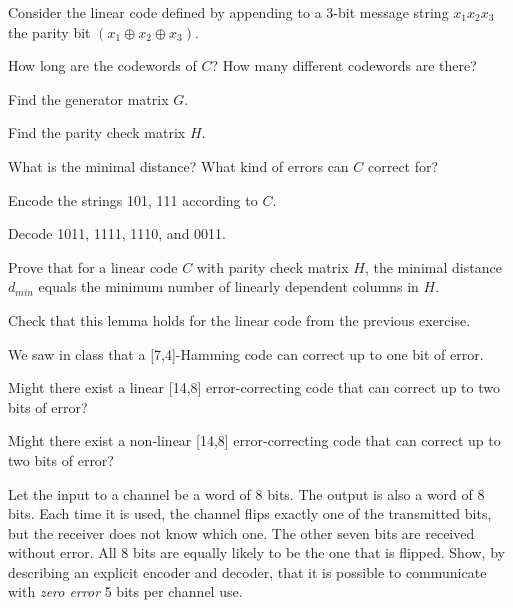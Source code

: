 \documentclass[a4paper,10pt,landscape,twocolumn]{scrartcl}
\begin{document}
\begin{exercise}
Consider the linear code defined by appending to a 3-bit message string $x_1x_2x_3$ the parity bit $(x_1 \oplus x_2 \oplus x_3)$.

\begin{subex}
How long are the codewords of $C$? How many different codewords are there?
\end{subex}

\begin{subex}
Find the generator matrix $G$.
\end{subex}

\begin{subex}
Find the parity check matrix $H$.
\end{subex}

\begin{subex}
What is the minimal distance? What kind of errors can $C$ correct for?
\end{subex}

\begin{subex}
Encode the strings 101, 111 according to $C$.
\end{subex}

\begin{subex}
Decode 1011, 1111, 1110, and 0011.
\end{subex}
\end{exercise}



\begin{exercise}
Prove that for a linear code $C$ with parity check matrix $H$, the minimal distance $d_{min}$ equals the minimum number of linearly dependent columns in $H$.

Check that this lemma holds for the linear code from the previous exercise.
\end{exercise}


\begin{exercise}
We saw in class that a [7,4]-Hamming code can correct up to one bit of error.
	\begin{subex}
	Might there exist a linear [14,8] error-correcting code that can correct up to two bits of error?
	\end{subex}
	\begin{subex**}
	Might there exist a non-linear [14,8] error-correcting code that can correct up to two bits of error?
	\end{subex**}
\end{exercise}


\begin{exercise}
Let the input to a channel be a word of 8 bits. The output is also a word of 8 bits. Each time it is used, the channel flips exactly one of the transmitted bits, but the receiver does not know which one. The other seven bits are received without error. All 8 bits are equally likely to be the one that is flipped. Show, by describing an explicit encoder and decoder, that it is possible to communicate with \emph{zero error} 5 bits per channel use.
\end{exercise}
\end{document}
